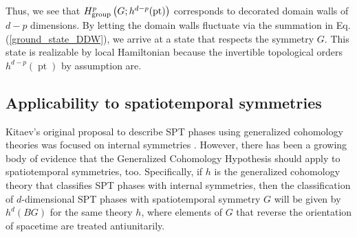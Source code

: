 \documentclass[sort&compress]{elsarticle}
\theoremstyle{theoremstyle}
\theoremstyle{framedtheoremstyle}
\theoremstyle{definitionstyle}
\theoremstyle{definitionstyle}
\theoremstyle{definitionstyle}
\theoremstyle{definitionstyle}
\theoremstyle{nameddefinitionstyle}
\theoremstyle{framednameddefinitionstyle}
\theoremstyle{proofstyle}
\theoremstyle{definitionstyle}
\newcommand{\paren}[1]{\left( #1 \right)}
\DeclareMathOperator{\pt}{pt}
\begin{document}
Thus, we see that $H^p_{\rm group}\paren{G; h^{d-p}(\pt)}$ corresponds to decorated domain walls of $d-p$ dimensions. By letting the domain walls fluctuate via the summation in Eq.\,(\ref{ground_state_DDW}), we arrive at a state that respects the symmetry $G$. This state is realizable by local Hamiltonian because the invertible topological orders $h^{d-p}(\pt)$ by assumption are.










\subsection{Applicability to spatiotemporal symmetries\label{subsec:spatiotemporal}}

Kitaev's original proposal to describe SPT phases using generalized cohomology theories was focused on internal symmetries \cite{Kitaev_Stony_Brook_2011_SRE_1, Kitaev_Stony_Brook_2013_SRE, Kitaev_IPAM}.  However, there has been a growing body of evidence \cite{Keyserlingk_Floquet, Else_Floquet, Potter_Floquet, Wen_1d, Cirac, Wen_sgSPT_1d, Hsieh_sgSPT, Hsieh_sgSPT_2, You_sgSPT, SPt, Cho_sgSPT, Yoshida_sgSPT, Jiang_sgSPT, Thorngren_sgSPT} that the Generalized Cohomology Hypothesis should apply to spatiotemporal symmetries, too. Specifically, if $h$ is the generalized cohomology theory that classifies SPT phases with internal symmetries, then the classification of $d$-dimensional SPT phases with spatiotemporal symmetry $G$ will be given by $h^d(BG)$ for the same theory $h$, where elements of $G$ that reverse the orientation of spacetime are treated antiunitarily.
\end{document}

